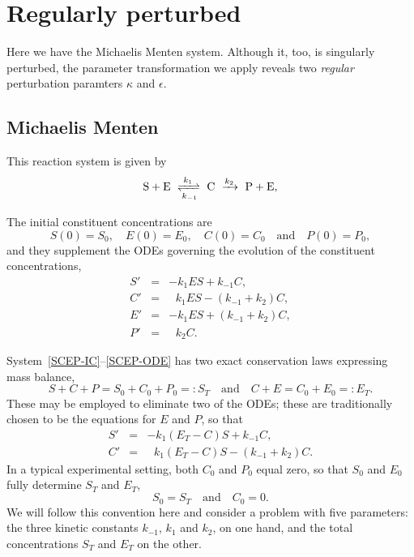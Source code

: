 \documentclass[11pt]{article}
\newcommand{\be}{\begin{equation}}
\newcommand{\ee}{\end{equation}}
\begin{document}
\section{Regularly perturbed}

Here we have the Michaelis Menten system. Although it, too, is singularly perturbed, the parameter transformation we apply reveals two \textit{regular} perturbation paramters $\kappa$ and $\epsilon$.

\subsection{Michaelis Menten}

This reaction system is given by
%
\[
 {\rm S + E}
\
 \xrightleftharpoons[k_{-1}]{k_1}
\
 {\rm C}
\
 \xrightarrow{k_2}
\
 {\rm P + E} ,
\label{s2c2p}
\]
%

The initial constituent concentrations are
%
\be
 S(0) = S_0 ,
\quad
 E(0) = E_0 ,
\quad
 C(0) = C_0
\quad\mbox{and}\quad
 P(0) = P_0 ,
\label{SCEP-IC}
\ee
%
and they supplement the ODEs governing the evolution
of the constituent concentrations,
%
\be
\begin{array}{rclcl}
 S' &=& -k_1 E S + k_{-1} C ,
\\
 C' &=& \ \ \, k_1 E S - (k_{-1} + k_2) C ,
\\
 E' &=& -k_1 E S + (k_{-1} + k_2) C ,
\\
 P' &=& \ \ \, k_2 C .
\end{array}
\ee

System~\eqref{SCEP-IC}--\eqref{SCEP-ODE} has
two exact conservation laws expressing mass balance,
%
\[
 S+C+P = S_0+C_0+P_0 =: S_T
\quad\mbox{and}\quad
 C+E = C_0+E_0 =: E_T .
\]
%
These may be employed to eliminate two of the ODEs;
these are traditionally chosen to be
the equations for $E$ and $P$,
so that
%
\be
\begin{array}{rclcl}
 S' &=& -k_1 (E_T-C) S + k_{-1} C ,
\\
 C' &=& \ \ \, k_1 (E_T-C) S - (k_{-1} + k_2) C .
\end{array}
\label{SC-ODE}
\ee
In a typical experimental setting,
both $C_0$ and $P_0$ equal zero,
so that $S_0$ and $E_0$ fully determine $S_T$ and $E_T$,
%
\be
 S_0 = S_T
\quad\mbox{and}\quad
 C_0 = 0 .
\label{SC-IP}
\ee
%
We will follow this convention here and consider a problem with five
parameters: the three kinetic constants $k_{-1}$, $k_1$ and $k_2$, on
one hand, and the total concentrations $S_T$ and $E_T$ on the other. \\
\end{document}
